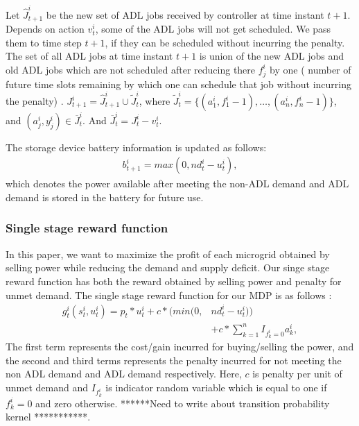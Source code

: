  Let $\widehat J_{t+1}^{i}$ be the new set of ADL jobs received by controller at time instant $t+1$. Depends on action $v_{t}^{i}$, some of the ADL jobs will not get scheduled. We pass them to time step $t+1$, if they can be scheduled without incurring the penalty. The set of all ADL jobs at time instant $t+1$ is union of the new ADL jobs and old ADL jobs which are not scheduled after reducing there  $f_{j}^{i}$ by one ( number of future time slots remaining by which one can schedule that job without incurring the penalty) .
$J_{t+1}^{i} = \widehat J_{t+1}^{i} \cup \widetilde J_{t}^{i}$, where $\widetilde J_{t}^{i} =  \{(a_{1}^{i}, f_{1}^{i} - 1),\ldots,(a_{n}^{i}, f_{n}^{i} - 1)\}$, and $ (a_{j}^{i}, y_{j}^{i}) \in \overline J_{t}^{i}$. And $\overline J_{t}^{i} = J_{t}^{i} - v_{t}^{i}$.

The storage device battery information is updated as follows:
\begin{align}
b_{t+1}^{i} = max(0,nd_{t}^{i} - u_{t}^{i}),
\end{align}
which denotes the power available after meeting the non-ADL demand and ADL demand is stored in the battery for future use.
\subsubsection{Single stage reward function}
In this paper, we want to maximize the profit of each microgrid obtained by selling power while reducing the demand and supply deficit. Our singe stage reward function has both the reward obtained by selling power and penalty for unmet demand. The single stage reward  function for our MDP is as follows :
\begin{align}
g_t^{i}(s_t^i,u_t^i) = p_{t}*u_{t}^{i} + c*(min(0,&nd_{t}^{i} - u_{t}^{i}))  \nonumber\\ &+ c* \sum_{k =1}^{n} I_{f_{k}^{i} = 0} a_{k}^{i} ,
\end{align}
The first term represents the cost/gain incurred for  buying/selling the power, and the second and third terms represents the penalty  incurred for not meeting the non ADL demand and ADL demand respectively. Here, $c$ is penalty per unit of unmet demand and $I_{f_{k}^{i}}$ is indicator random variable which is equal to one if $f_{k}^{i} =0$ and zero otherwise. 
******Need to write about transition probability kernel ***********.
